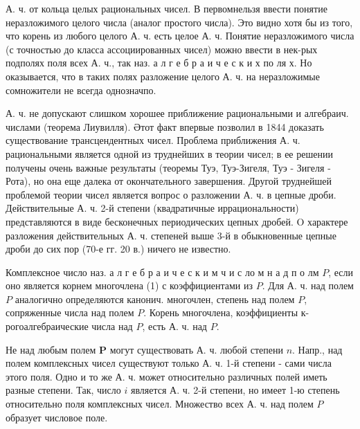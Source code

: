 \documentclass[10pt]{article}
\begin{document}
А. ч. от кольца целых рациональных чисел. В первомнельзя ввести понятие неразложимого целого числа (аналог простого числа). Это видно хотя бы из того, что корень из любого целого А. ч. есть целое А. ч. Понятие неразложимого числа (с точностью до класса ассоциированных чисел) можно ввести в нек-рых подполях поля всех А. ч., так наз. а л г е б р а и ч е с к и х по ля х. Но оказывается, что в таких полях разложение целого А. ч. на неразложимые сомножители не всегда однозначпо.



А. ч. не допускают слишком хорошее приближение рациональными и алгебраич. числами (теорема Лиувилля). Әтот факт впервые позволил в 1844 доказать существование трансцендентных чисел. Проблема приближения А. ч. рациональными является одной из труднейших в теории чисел; в ее решении получены очень важные результаты (теоремы Туэ, Туэ-Зигеля, Туэ - Зигеля - Рота), но она еще далека от окончательного завершения. Другой труднейшей проблемой теории чисел является вопрос о разложении А. ч. в цепные дроби. Действительные А. ч. 2-й степени (квадратичные иррациональности) представляются в виде бесконечных периодических цепных дробей. $\mathrm{O}$ характере разложения действительных А. ч. степеней выше 3-й в обыкновенные цепные дроби до сих пор (70-е гг. 20 в.) ничего не известно.



Комплексное число наз. а л г е б р а и ч е с к и м ч и с ло м н а д п о лм $P$, если оно является корнем многочлена (1) с коэффициентами из $P$. Для А. ч. над полем $P$ аналогично определяются канонич. многочлен, степень над полем $P$, сопряженные числа над полем $P$. Корень многочлена, коэффициенты к-рогоалгебраические числа над $P$, есть А. ч. над $P$.



Не над любым полем $\boldsymbol{P}$ могут существовать А. ч. любой степени $n$. Напр., над полем комплексных чисел существуют только А. ч. 1-й степени - сами числа этого поля. Одно и то же А. ч. может относительно различных полей иметь разные степени. Так, число $i$ является А. ч. 2-й степени, но имеет 1-ю степень относительно поля комплексных чисел. Множество всех А. ч. над полем $P$ образует числовое поле.
\end{document}
